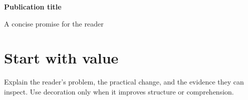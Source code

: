 \documentclass[10.5pt,a4paper]{article}
\begin{document}
{\color{KFGreen}\bfseries\small \KFBrandName}\par
\vspace{10mm}
{\color{KFBlack}\fontsize{28}{34}\selectfont\bfseries Publication title}\par
{\color{KFSlate}\large A concise promise for the reader}\par

\section*{Start with value}
Explain the reader's problem, the practical change, and the evidence they can
inspect. Use decoration only when it improves structure or comprehension.
\end{document}
